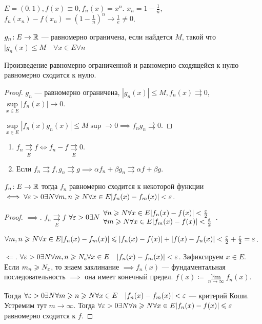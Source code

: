 \begin{example}
    $E=(0, 1), f(x) \equiv 0, f_n(x) = x^n$. $x_n = 1 - \frac{1}{n}$, $f_n(x_n) - f(x_n) = \left(1-\frac{1}{n}\right)^n \to \frac{1}{e} \neq 0$.
\end{example}
\begin{definition}
    $g_n \!: E \to \mathbb{R}$ --- равномерно ограничена, если найдется  $M$, такой что  $|g_n(x) \le M \quad \forall x \in E \forall n$
\end{definition}
\begin{statement}
    Произведение равномерно ограниченной и равномерно сходящейся к нулю равномерно сходится к нулю.
\end{statement}
\begin{proof}
    $g_n$ --- равномерно ограничена,  $|g_n(x)| \le M, f_n(x) \rightrightarrows 0$, $\sup\limits_{x \in E} |f_n(x)| \to 0$.

     $\sup\limits_{x \in E} |f_n(x)g_n(x)| \le M \sup \to 0 \implies f_ng_n \rightrightarrows 0$.
\end{proof}
\begin{remark}
    \begin{enumerate}
        \item $f_n \underset{E}{\rightrightarrows} f \iff f_n - f \underset{E}{\rightrightarrows} 0$.
        \item  Если $f_n \rightrightarrows f, g_n \rightrightarrows g \implies \alpha f_n + \beta g_n \rightrightarrows \alpha f + \beta g$.
    \end{enumerate}
\end{remark}
\begin{theorem}
    $f_n\!: E \to \mathbb{R}$ тогда  $f_n$ равномерно сходится к некоторой функции  $\iff \forall \varepsilon > 0 \exists N \forall m, n \geqslant N \forall x \in E |f_n(x) - f_m(x) | < \varepsilon$.
\end{theorem}
\begin{proof}
    $\implies$.  $f_n \underset{E}{\rightrightarrows} f$  $\forall \varepsilon > 0 \exists N \begin{array}{l} \forall n \geqslant N \forall x \in E |f_n(x) - f(x)| < \frac{\varepsilon}{2} \\ \forall m \geqslant N \forall x \in E |f_m(x) - f(x)| < \frac{\varepsilon}{2} \end{array}$. 

    $\forall m, n \geqslant N \forall x \in E |f_n(x) - f_m(x)| \leqslant |f_n(x) - f(x)| + |f(x) - f_n(x)| < \frac{\varepsilon}{2} + \frac{\varepsilon}{2} = \varepsilon$.

    $\Leftarrow$.  $\forall \varepsilon > 0 \exists N \forall m, n \geqslant N_e \forall x \in E\quad |f_n(x) - f_m(x)| < \varepsilon$. Зафиксируем $x \in E$. Если  $m_n \geqslant N_\varepsilon$, то знаем заклинание $\implies f_n(x)$ --- фундаментальная последовательность  $\implies$ она имеет конечный предел.  $f(x) \coloneqq \lim\limits_{n \to \infty} f_n(x)$.

    Тогда  $\forall \varepsilon > 0 \exists N \forall m \geqslant n \geqslant N \forall x \in E \quad |f_n(x) - f_m(x)| < \varepsilon$ --- критерий Коши. Устремим тут $m \to \infty$. Тогда  $\forall \varepsilon > 0 \exists N \forall n \geqslant N \forall x \in E |f_n(x) - f(x)| \leqslant \varepsilon$ равномерно сходится к $f$.
\end{proof}
